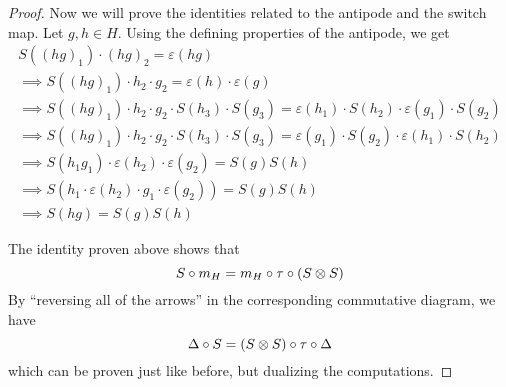 \begin{proof}
Now we will prove the identities related to the antipode and the switch map. Let \(g, h \in H\). Using the defining properties of the antipode, we get
\begin{gather*}
    S\left((h g)_1\right) \cdot (hg)_2 = \varepsilon(hg) \\
    \implies
    S\left((h g)_1\right) \cdot h_2 \cdot g_2 = \varepsilon(h) \cdot \varepsilon(g) \\
    \implies
    S\left((h g)_1\right) \cdot h_2 \cdot g_2 \cdot S\left(h_3\right) \cdot S\left(g_3\right) = \varepsilon\left(h_1\right) \cdot S\left(h_2\right) \cdot \varepsilon\left(g_1\right) \cdot S\left(g_2\right) \\
    \implies
    S\left((h g)_1\right) \cdot h_2 \cdot g_2 \cdot S\left(h_3\right) \cdot S\left(g_3\right) = \varepsilon\left(g_1\right) \cdot S\left(g_2\right) \cdot \varepsilon\left(h_1\right) \cdot S\left(h_2\right) \\
    \implies
    S\left(h_1 g_1\right) \cdot \varepsilon\left(h_2\right) \cdot \varepsilon\left(g_2\right) = S(g) S(h) \\
    \implies
    S\left(h_1 \cdot \varepsilon\left(h_2\right) \cdot g_1 \cdot \varepsilon\left(g_2\right)\right) =  S(g) S(h) \\
    \implies
    S(hg) = S(g) S(h)
\end{gather*}

The identity proven above shows that
\[
    S \circ m_H = m_H \circ \tau \circ (S \otimes S)
\]
By ``reversing all of the arrows'' in the corresponding commutative diagram, we have
\[
    \Delta \circ S = (S \otimes S) \circ \tau \circ \Delta
\]
which can be proven just like before, but dualizing the computations.
\end{proof}
